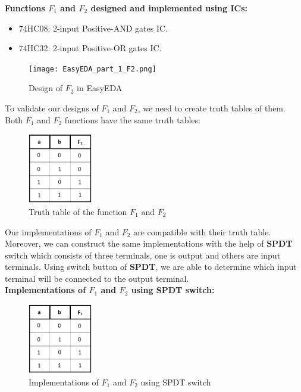 \documentclass[pdftex,12pt,a4paper]{article}
\begin{document}
\begin{itemize}
   \textbf{Functions $F_1$ and $F_2$ designed and implemented using ICs:}
    
   \begin{itemize}
       \item 74HC08: 2-input Positive-AND gates IC.
       \item 74HC32: 2-input Positive-OR gates IC.
   \end{itemize}
   \begin{figure}[H]
    \centering
        \texttt{[image: EasyEDA\_part\_1\_F2.png]}	
        \caption{Design of \textbf{$F_2$} in EasyEDA}
   \end{figure}
   
 
   To validate our designs of $F_1$ and $F_2$, we need to create truth tables of them. Both $F_1$ and $F_2$ functions have the same truth tables:\\
   \begin{figure}[H]
    \centering
        \includegraphics[width=0.25\textwidth]{f1truth.png}	
        \caption{Truth table of the function \textbf{$F_1$} and \textbf{$F_2$}}
   \end{figure}
   Our implementations of $F_1$ and $F_2$ are compatible with their truth table.\\
   Moreover, we can construct the same implementations with the help of \textbf{SPDT} switch which consists of three terminals, one is output and others are input terminals. Using switch button of \textbf{SPDT}, we are able to determine which input terminal will be connected to the output terminal.\\

   \textbf{Implementations of $F_1$ and $F_2$ using SPDT switch:}\\
   \begin{figure}[H]
    \centering
        \includegraphics[width=0.25\textwidth]{f1truth.png}	
        \caption{Implementations of $F_1$ and $F_2$ using SPDT switch}
        \label{fig1}
   \end{figure}
\end{itemize}
\end{document}
